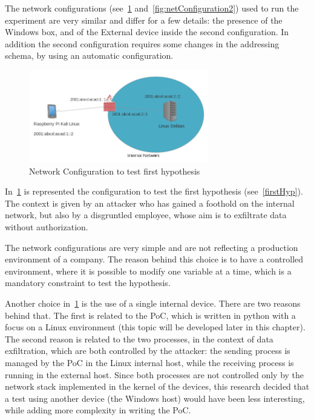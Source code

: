\documentclass[12pt]{article}
\begin{document}
The network configurations (see~\ref{fig:netConfiguration1} and~\ref{fig:netConfiguration2}) used to run the experiment are very similar and differ for a few details: the presence of the Windows box, and of the External device inside the second configuration. In addition the second configuration requires some changes in the addressing schema, by using an automatic configuration.


\begin{figure}[ht] 
\begin{center}
\includegraphics[width=0.7\textwidth]{networkTopology1}
\caption{Network Configuration to test first hypothesis}
\label{fig:netConfiguration1}
\end{center}
\end{figure}

In~\ref{fig:netConfiguration1} is represented the configuration to test the first hypothesis (see~\ref{firstHyp}). The context is given by an attacker who has gained a foothold on the internal network, but also by a disgruntled employee, whose aim is to exfiltrate data without authorization.

The network configurations are very simple and are not reflecting a production environment of a company. The reason behind this choice is to have a controlled environment, where it is possible to modify one variable at a time, which is a mandatory constraint to test the hypothesis.

Another choice in~\ref{fig:netConfiguration1} is the use of a single internal device. There are two reasons behind that. The first is related to the PoC, which is written in python with a focus on a Linux environment (this topic will be developed later in this chapter). The second reason is related to the two processes, in the context of data exfiltration, which are both controlled by the attacker: the sending process is managed by the PoC in the Linux internal host, while the receiving process is running in the external host. Since both processes are not controlled only by the network stack implemented in the kernel of the devices, this research decided that a test using another device (the Windows host) would have been less interesting, while adding more complexity in writing the PoC.
\end{document}
